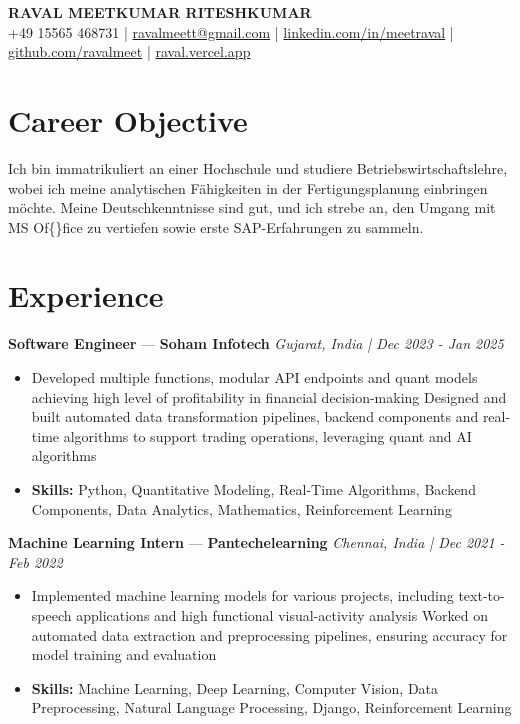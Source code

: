 \documentclass[a4paper,10pt]{article}
\begin{document}
\begin{center}
  {\Large\bfseries RAVAL MEETKUMAR RITESHKUMAR}\\[2pt]
  {\small +49 15565 468731 \;|\; \href{mailto:ravalmeett@gmail.com}{ravalmeett@gmail.com} \;|\; \href{https://www.linkedin.com/in/meetraval/}{linkedin.com/in/meetraval} \;|\; \href{https://github.com/ravalmeet}{github.com/ravalmeet} \;|\; \href{https://raval.vercel.app/}{raval.vercel.app}}
\end{center}
\vspace{-3pt}

\section*{Career Objective}
Ich bin immatrikuliert an einer Hochschule und studiere Betriebswirtschaftslehre, wobei ich meine analytischen Fähigkeiten in der Fertigungsplanung einbringen möchte. Meine Deutschkenntnisse sind gut, und ich strebe an, den Umgang mit MS Of\{\}fice zu vertiefen sowie erste SAP-Erfahrungen zu sammeln.\par

\section*{Experience}
\textbf{Software Engineer} — \textbf{Soham Infotech} \hfill \textit{Gujarat, India \;|\; Dec 2023 - Jan 2025}\par
\vspace{1pt}
\begin{itemize}
  \item Developed multiple functions, modular API endpoints and quant models achieving high level of profitability in financial decision-making Designed and built automated data transformation pipelines, backend components and real-time algorithms to support trading operations, leveraging quant and AI algorithms
  \item \textbf{Skills:} Python, Quantitative Modeling, Real-Time Algorithms, Backend Components, Data Analytics, Mathematics, Reinforcement Learning
\end{itemize}
\vspace{3pt}
\textbf{Machine Learning Intern} — \textbf{Pantechelearning} \hfill \textit{Chennai, India \;|\; Dec 2021 - Feb 2022}\par
\vspace{1pt}
\begin{itemize}
  \item Implemented machine learning models for various projects, including text-to-speech applications and high functional visual-activity analysis Worked on automated data extraction and preprocessing pipelines, ensuring accuracy for model training and evaluation
  \item \textbf{Skills:} Machine Learning, Deep Learning, Computer Vision, Data Preprocessing, Natural Language Processing, Django, Reinforcement Learning
\end{itemize}
\end{document}
